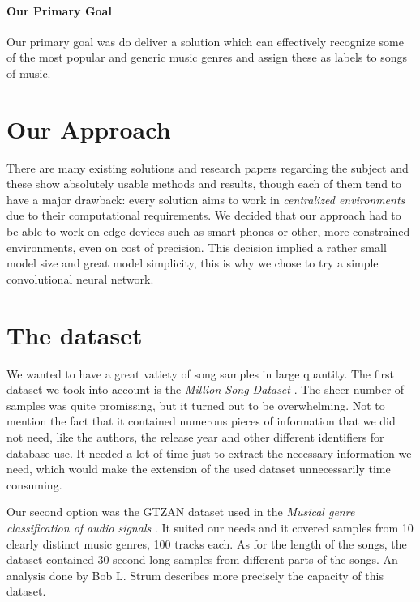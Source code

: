 \documentclass{article}
\begin{document}
    \paragraph{Our Primary Goal}

    Our primary goal was do deliver a solution which can effectively recognize some of the
    most popular and generic music genres and assign these as labels to songs of music.

    \section{Our Approach}

    There are many existing solutions and research papers regarding the subject and these
    show absolutely usable methods and results, though each of them tend to have a major
    drawback: every solution aims to work in \emph{centralized environments} due to their
    computational requirements. We decided that our approach had to be able to work on
    edge devices such as smart phones or other, more constrained environments, even on
    cost of precision. This decision implied a rather small model size and great model
    simplicity, this is why we chose to try a simple convolutional neural network.

	\section{The dataset}

	We wanted to have a great vatiety of song samples in large quantity.
	The first dataset we took into account is the \textit{Million Song Dataset} \cite{million}.
	The sheer number of samples was quite promissing, but it turned out to be overwhelming.
	Not to mention the fact that it contained numerous pieces of information that we did not need, like the authors,
	the release year and other different identifiers for database use. 
	It needed a lot of time just to extract the necessary information we need, which would make the extension 
	of the used dataset unnecessarily time consuming. 


	Our second option was the GTZAN \cite{gtzan_art} dataset used in the \textit{Musical genre classification of audio signals} \cite{gtzan}.
	It suited our needs and it covered samples from 10 clearly distinct music genres, 100 tracks each.
	As for the length of the songs, the dataset contained 30 second long samples from different parts of the songs.
	An analysis done by Bob L. Strum \cite{gtzan_anal} describes more precisely the capacity of this dataset.
\end{document}
